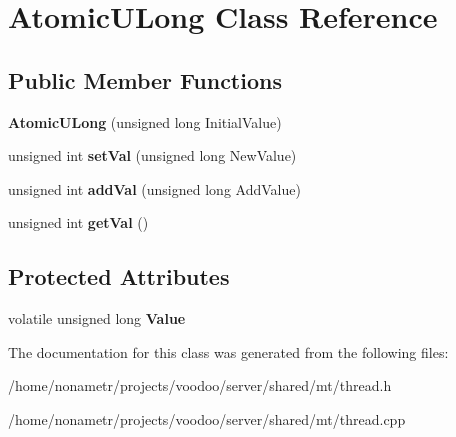 \hypertarget{classAtomicULong}{\section{\-Atomic\-U\-Long \-Class \-Reference}
\label{classAtomicULong}
}
\subsection*{\-Public \-Member \-Functions}
\begin{DoxyCompactItemize}
\item 
\hypertarget{classAtomicULong_a3a096a93ad40cda8bee202c76e2681e6}{{\bfseries \-Atomic\-U\-Long} (unsigned long \-Initial\-Value)}\label{classAtomicULong_a3a096a93ad40cda8bee202c76e2681e6}

\item 
\hypertarget{classAtomicULong_ad074902cbe94f5540ff62b25b87e97e7}{unsigned int {\bfseries set\-Val} (unsigned long \-New\-Value)}\label{classAtomicULong_ad074902cbe94f5540ff62b25b87e97e7}

\item 
\hypertarget{classAtomicULong_ad9524e382ccaf935278851dbfba5e01f}{unsigned int {\bfseries add\-Val} (unsigned long \-Add\-Value)}\label{classAtomicULong_ad9524e382ccaf935278851dbfba5e01f}

\item 
\hypertarget{classAtomicULong_a3ca01363b4dd9d269d0858d58e2df532}{unsigned int {\bfseries get\-Val} ()}\label{classAtomicULong_a3ca01363b4dd9d269d0858d58e2df532}

\end{DoxyCompactItemize}
\subsection*{\-Protected \-Attributes}
\begin{DoxyCompactItemize}
\item 
\hypertarget{classAtomicULong_a65f08ef36d8f8160866d1c8a15dd47af}{volatile unsigned long {\bfseries \-Value}}\label{classAtomicULong_a65f08ef36d8f8160866d1c8a15dd47af}

\end{DoxyCompactItemize}


\-The documentation for this class was generated from the following files\-:\begin{DoxyCompactItemize}
\item 
/home/nonametr/projects/voodoo/server/shared/mt/thread.\-h\item 
/home/nonametr/projects/voodoo/server/shared/mt/thread.\-cpp\end{DoxyCompactItemize}
